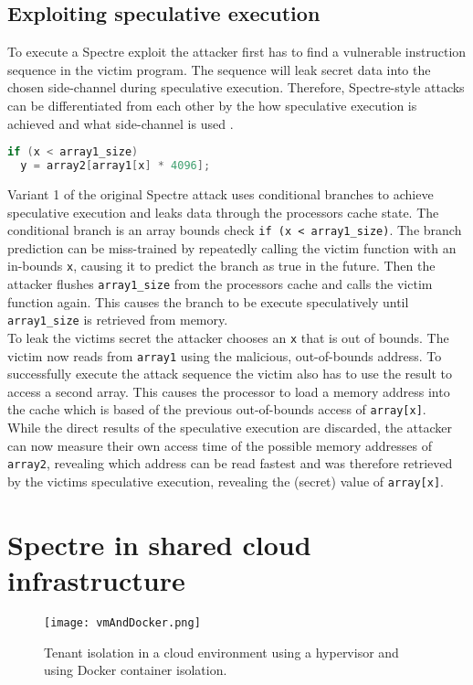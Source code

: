 \documentclass[conference,compsoc,final,a4paper]{IEEEtran}
\begin{document}
\subsection{Exploiting speculative execution}
To execute a Spectre exploit the attacker first has to find a vulnerable instruction sequence in the victim program. The sequence will leak secret data into the chosen side-channel during speculative execution. Therefore, Spectre-style attacks can be differentiated from each other by the how speculative execution is achieved and what side-channel is used \cite{kocher2018spectre}. \\
\begin{lstlisting}[language=C, caption=Spectre Variant 1 example \cite{kocher2018spectre}]
if (x < array1_size)
  y = array2[array1[x] * 4096];
\end{lstlisting}
Variant 1 of the original Spectre attack uses conditional branches to achieve speculative execution and leaks data through the processors cache state. The conditional branch is an array bounds check \lstinline|if (x < array1_size)|. The branch prediction can be miss-trained by repeatedly calling the victim function with an in-bounds \lstinline|x|, causing it to predict the branch as true in the future. Then the attacker flushes \lstinline|array1_size| from the processors cache and calls the victim function again. This causes the branch to be execute speculatively until \lstinline|array1_size| is retrieved from memory. \\
To leak the victims secret the attacker chooses an \lstinline|x| that is out of bounds. The victim now reads from \lstinline|array1| using the malicious, out-of-bounds address. To successfully execute the attack sequence the victim also has to use the result to access a second array. This causes the processor to load a memory address into the cache which is based of the previous out-of-bounds access of \lstinline|array[x]|. \\
While the direct results of the speculative execution are discarded, the attacker can now measure their own access time of the possible memory addresses of \lstinline|array2|, revealing which address can be read fastest and was therefore retrieved by the victims speculative execution, revealing the (secret) value of \lstinline|array[x]|.
\section{Spectre in shared cloud infrastructure}
\begin{figure}[!ht]
\centering
\texttt{[image: vmAndDocker.png]}
\caption{Tenant isolation in a cloud environment using a hypervisor and using Docker container isolation.}
\label{virtmem}
\end{figure}
\end{document}
